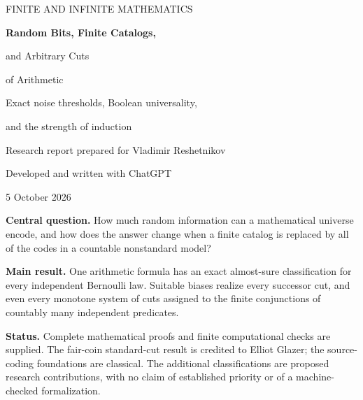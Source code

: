 \documentclass[11pt]{article}
\numberwithin{equation}{section}
\theoremstyle{definition}
\theoremstyle{remark}
\begin{document}
\hypersetup{pageanchor=false}
\begin{titlepage}
\centering
\vspace*{1.2cm}
{\large\color{muted}FINITE AND INFINITE MATHEMATICS\par}
\vspace{1.1cm}
{\Huge\bfseries\color{inkblue}Random Bits, Finite Catalogs,\par
 and Arbitrary Cuts\par of Arithmetic\par}
\vspace{0.8cm}
{\Large Exact noise thresholds, Boolean universality,\par
 and the strength of induction\par}
\vspace{1.2cm}
{\large Research report prepared for Vladimir Reshetnikov\par}
\vspace{0.2cm}
{\normalsize Developed and written with ChatGPT\par}
\vspace{0.4cm}
{\normalsize 5 October 2026\par}
\vfill
\begin{minipage}{0.89\textwidth}
\small
\textbf{Central question.} How much random information can a mathematical
universe encode, and how does the answer change when a finite catalog is
replaced by all of the codes in a countable nonstandard model?

\medskip
\textbf{Main result.} One arithmetic formula has an exact almost-sure
classification for every independent Bernoulli law. Suitable biases realize
every successor cut, and even every monotone system of cuts assigned to the
finite conjunctions of countably many independent predicates.

\medskip
\textbf{Status.} Complete mathematical proofs and finite computational
checks are supplied. The fair-coin standard-cut result is credited to Elliot
Glazer; the source-coding foundations are classical. The additional
classifications are proposed research contributions, with no claim of
established priority or of a machine-checked formalization.
\end{minipage}
\vspace*{0.8cm}
\end{titlepage}
\hypersetup{pageanchor=true}
\end{document}
